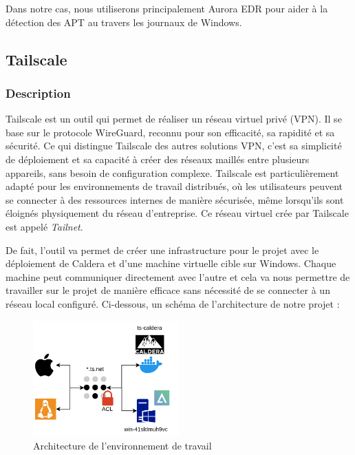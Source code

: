 \documentclass[12pt,letterpaper]{article}
\begin{document}
Dans notre cas, nous utiliserons principalement Aurora EDR pour aider à la détection des APT au travers les journaux de Windows.

\subsection{Tailscale}

\subsubsection{Description}

Tailscale est un outil qui permet de réaliser un réseau virtuel privé (VPN).
Il se base sur le protocole WireGuard, reconnu pour son efficacité, sa rapidité et sa sécurité.
Ce qui distingue Tailscale des autres solutions VPN, c'est sa simplicité de déploiement et sa capacité à créer des réseaux maillés entre plusieurs appareils, sans besoin de configuration complexe.
Tailscale est particulièrement adapté pour les environnements de travail distribués, où les utilisateurs peuvent se connecter à des ressources internes de manière sécurisée, même lorsqu'ils sont éloignés physiquement du réseau d'entreprise.
Ce réseau virtuel crée par Tailscale est appelé \textit{Tailnet}.

\bigskip

De fait, l'outil va permet de créer une infrastructure pour le projet avec le déploiement de Caldera et d'une machine virtuelle cible sur Windows.
Chaque machine peut communiquer directement avec l'autre et cela va nous permettre de travailler sur le projet de manière efficace sans nécessité de se connecter à un réseau local configuré.
Ci-dessous, un schéma de l'architecture de notre projet :
\begin{figure}[!h]
    \centering
    \includegraphics[width=0.5\textwidth]{images/infra_scheme.png}
    \caption{Architecture de l'environnement de travail}
    \label{fig:architecture}
\end{figure}
\end{document}
